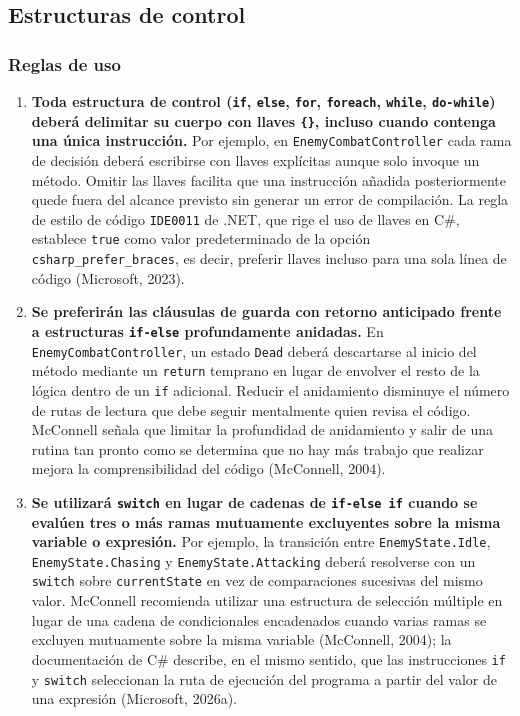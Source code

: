 \subsection{Estructuras de control}

\subsubsection{Reglas de uso}

\begin{enumerate}
  \item \textbf{Toda estructura de control (\texttt{if}, \texttt{else}, \texttt{for}, \texttt{foreach}, \texttt{while}, \texttt{do-while}) deberá delimitar su cuerpo con llaves \texttt{\{\}}, incluso cuando contenga una única instrucción.} Por ejemplo, en \texttt{EnemyCombatController} cada rama de decisión deberá escribirse con llaves explícitas aunque solo invoque un método. Omitir las llaves facilita que una instrucción añadida posteriormente quede fuera del alcance previsto sin generar un error de compilación. La regla de estilo de código \texttt{IDE0011} de .NET, que rige el uso de llaves en C\#, establece \texttt{true} como valor predeterminado de la opción \texttt{csharp\_prefer\_braces}, es decir, preferir llaves incluso para una sola línea de código (Microsoft, 2023).

  \item \textbf{Se preferirán las cláusulas de guarda con retorno anticipado frente a estructuras \texttt{if-else} profundamente anidadas.} En \texttt{EnemyCombatController}, un estado \texttt{Dead} deberá descartarse al inicio del método mediante un \texttt{return} temprano en lugar de envolver el resto de la lógica dentro de un \texttt{if} adicional. Reducir el anidamiento disminuye el número de rutas de lectura que debe seguir mentalmente quien revisa el código. McConnell señala que limitar la profundidad de anidamiento y salir de una rutina tan pronto como se determina que no hay más trabajo que realizar mejora la comprensibilidad del código (McConnell, 2004).

  \item \textbf{Se utilizará \texttt{switch} en lugar de cadenas de \texttt{if-else if} cuando se evalúen tres o más ramas mutuamente excluyentes sobre la misma variable o expresión.} Por ejemplo, la transición entre \texttt{EnemyState.Idle}, \texttt{EnemyState.Chasing} y \texttt{EnemyState.Attacking} deberá resolverse con un \texttt{switch} sobre \texttt{currentState} en vez de comparaciones sucesivas del mismo valor. McConnell recomienda utilizar una estructura de selección múltiple en lugar de una cadena de condicionales encadenados cuando varias ramas se excluyen mutuamente sobre la misma variable (McConnell, 2004); la documentación de C\# describe, en el mismo sentido, que las instrucciones \texttt{if} y \texttt{switch} seleccionan la ruta de ejecución del programa a partir del valor de una expresión (Microsoft, 2026a).


\end{enumerate}
